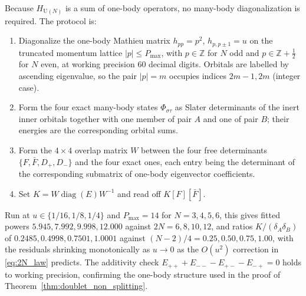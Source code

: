 \documentclass[11pt,a4paper]{article}
\theoremstyle{definition}
\DeclareMathOperator{\diag}{diag}
\newcommand{\Z}{\mathbb{Z}}
\newcommand{\U}{\mathrm{U}}
\begin{document}
Because $H_{\U(N)}$ is a sum of one-body operators, no many-body diagonalization is required. The protocol is:
\begin{enumerate}\itemsep2pt
  \item Diagonalize the one-body Mathieu matrix $h_{pp} = p^2$, $h_{p,p\pm1} = u$ on the truncated momentum lattice $|p|\le P_{\max}$, with $p\in\Z$ for $N$ odd and $p\in\Z+\tfrac12$ for $N$ even, at working precision $60$ decimal digits. Orbitals are labelled by ascending eigenvalue, so the pair $|p| = m$ occupies indices $2m-1, 2m$ (integer case).
  \item Form the four exact many-body states $\Phi_{\sigma\tau}$ as Slater determinants of the inert inner orbitals together with one member of pair $A$ and one of pair $B$; their energies are the corresponding orbital sums.
  \item Form the $4\times4$ overlap matrix $W$ between the four free determinants $\{F,\bar F,D_+,D_-\}$ and the four exact ones, each entry being the determinant of the corresponding submatrix of one-body eigenvector coefficients.
  \item Set $K = W\diag(E)W^{-1}$ and read off $K[F][\bar F]$.
\end{enumerate}
Run at $u\in\{1/16,1/8,1/4\}$ and $P_{\max} = 14$ for $N = 3,4,5,6$, this gives fitted powers $5.945, 7.992, 9.998, 12.000$ against $2N = 6,8,10,12$, and ratios $K/(\delta_A\delta_B)$ of $0.2485, 0.4998, 0.7501, 1.0001$ against $(N-2)/4 = 0.25, 0.50, 0.75, 1.00$, with the residuals shrinking monotonically as $u\to0$ as the $O(u^2)$ correction in \eqref{eq:2N_law} predicts. The additivity check $E_{++} + E_{--} - E_{+-} - E_{-+} = 0$ holds to working precision, confirming the one-body structure used in the proof of Theorem~\ref{thm:doublet_non_splitting}.
\end{document}
